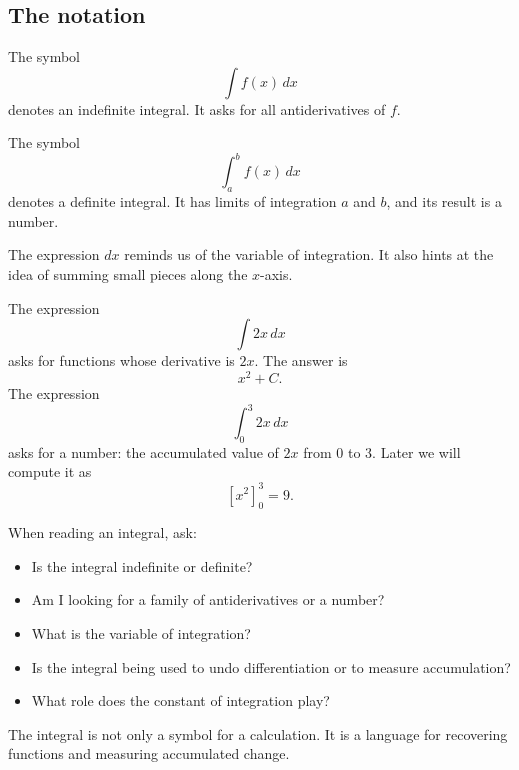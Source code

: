 \subsection*{The notation}

The symbol
\[
\int f(x)\,dx
\]
denotes an indefinite integral. It asks for all antiderivatives of \(f\).

The symbol
\[
\int_a^b f(x)\,dx
\]
denotes a definite integral. It has limits of integration \(a\) and \(b\), and its result is a number.

The expression \(dx\) reminds us of the variable of integration. It also hints at the idea of summing small pieces along the \(x\)-axis.

\begin{examplebox}
The expression
\[
\int 2x\,dx
\]
asks for functions whose derivative is \(2x\). The answer is
\[
x^2+C.
\]
The expression
\[
\int_0^3 2x\,dx
\]
asks for a number: the accumulated value of \(2x\) from \(0\) to \(3\). Later we will compute it as
\[
\left[x^2\right]_0^3=9.
\]
\end{examplebox}

\begin{summarybox}
When reading an integral, ask:
\begin{itemize}
\item Is the integral indefinite or definite?
\item Am I looking for a family of antiderivatives or a number?
\item What is the variable of integration?
\item Is the integral being used to undo differentiation or to measure accumulation?
\item What role does the constant of integration play?
\end{itemize}
\end{summarybox}

The integral is not only a symbol for a calculation. It is a language for recovering functions and measuring accumulated change.